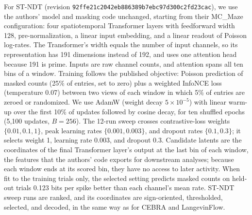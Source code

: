 For ST-NDT (revision \texttt{92ffe21c2042eb886389b7ebc97d300c2fd23cac}), we use the authors' model and masking code unchanged, starting from their MC\_Maze configuration: four spatiotemporal Transformer layers with feedforward width 128, pre-normalization, a linear input embedding, and a linear readout of Poisson log-rates. The Transformer's width equals the number of input channels, so its representation has 191 dimensions instead of 192, and uses one attention head because 191 is prime. Inputs are raw channel counts, and attention spans all ten bins of a window. Training follows the published objective: Poisson prediction of masked counts (25\% of entries, set to zero) plus a weighted InfoNCE loss (temperature 0.07) between two views of each window in which 5\% of entries are zeroed or randomized. We use AdamW (weight decay $5\times10^{-5}$) with linear warm-up over the first 10\% of updates followed by cosine decay, for ten shuffled epochs (5,100 updates, $B=256$). The 12-run sweep crosses contrastive-loss weights $\{0.01,0.1,1\}$, peak learning rates $\{0.001,0.003\}$, and dropout rates $\{0.1,0.3\}$; it selects weight 1, learning rate 0.003, and dropout 0.3. Candidate latents are the coordinates of the final Transformer layer's output at the last bin of each window, the features that the authors' code exports for downstream analyses; because each window ends at its scored bin, they have no access to later activity. When fit to the training trials only, the selected setting predicts masked counts on held-out trials 0.123 bits per spike better than each channel's mean rate. ST-NDT sweep runs are ranked, and its coordinates are sign-oriented, thresholded, selected, and decoded, in the same way as for CEBRA and LangevinFlow.
